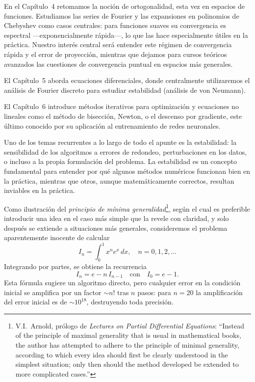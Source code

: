 \documentclass[a4paper,11pt]{report}
\begin{document}
En el Capítulo~4 retomamos la noción de ortogonalidad, esta vez en espacios de funciones. Estudiamos las series de Fourier y las expansiones en polinomios de Chebyshev como casos centrales: para funciones suaves su convergencia es espectral ---exponencialmente rápida---, lo que las hace especialmente útiles en la práctica.  Nuestro interés central será entender este régimen de convergencia rápida y el error de proyección, mientras que dejamos para cursos teóricos avanzados las cuestiones de convergencia puntual en espacios más generales.

El Capítulo~5 aborda ecuaciones diferenciales, donde centralmente utilizaremos el análisis de Fourier discreto para estudiar estabilidad (análisis de von Neumann).

El Capítulo~6 introduce métodos iterativos para optimización y ecuaciones no lineales como el método de bisección, Newton, o el descenso por gradiente, este último conocido por su aplicación al entrenamiento de redes neuronales.

Uno de los temas recurrentes a lo largo de todo el apunte es la estabilidad: la sensibilidad de los algoritmos a errores de redondeo, perturbaciones en los datos, o incluso a la propia formulación del problema. La estabilidad es un concepto fundamental para entender por qué algunos métodos numéricos funcionan bien en la práctica, mientras que otros, aunque matemáticamente correctos, resultan inviables en la práctica.

Como ilustración del \textit{principio de mínima generalidad}\footnote{V.I.\ Arnold, prólogo de \textit{Lectures on Partial Differential Equations}: ``Instead of the principle of maximal generality that is usual in mathematical books, the author has attempted to adhere to the principle of minimal generality, according to which every idea should first be clearly understood in the simplest situation; only then should the method developed be extended to more complicated cases.''}, según el cual es preferible introducir una idea en el caso más simple que la revele con claridad, y solo después se extiende a situaciones más generales, consideremos el problema aparentemente inocente de calcular
\[
I_n = \int_0^1 x^n e^x\, dx, \quad n = 0, 1, 2, \ldots
\]
Integrando por partes, se obtiene la recurrencia 
\[
I_n = e - n\, I_{n-1} \quad \text{con} \quad I_0 = e - 1.  
\]
Esta fórmula sugiere un algoritmo directo, pero cualquier error en la condición inicial se amplifica por un factor $\sim n!$ tras $n$ pasos: para $n = 20$ la amplificación del error inicial es de $\sim 10^{18}$, destruyendo toda precisión.
\end{document}
